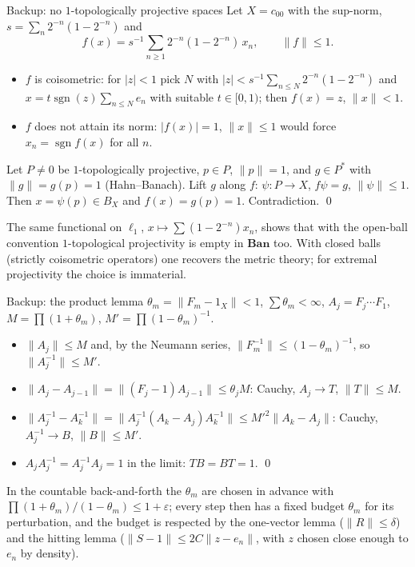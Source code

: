 \documentclass[10pt,aspectratio=169]{beamer}
\newcommand{\Ban}{\mathbf{Ban}}
\begin{document}
\begin{frame}{Backup: no $1$-topologically projective spaces}
  Let $X=c_{00}$ with the sup-norm, $s=\sum_n2^{-n}(1-2^{-n})$ and
  \[
    f(x)=s^{-1}\sum_{n\ge1}2^{-n}(1-2^{-n})\,x_n ,\qquad \|f\|\le1 .
  \]
  \begin{itemize}
    \item $f$ is coisometric: for $|z|<1$ pick $N$ with
      $|z|<s^{-1}\sum_{n\le N}2^{-n}(1-2^{-n})$ and $x=t\operatorname{sgn}(z)\sum_{n\le N}e_n$
      with suitable $t\in[0,1)$; then $f(x)=z$, $\|x\|<1$.
    \item $f$ does not attain its norm: $|f(x)|=1$, $\|x\|\le1$ would force
      $x_n=\operatorname{sgn}f(x)$ for all $n$.
  \end{itemize}
  \medskip
  Let $P\ne0$ be $1$-topologically projective, $p\in P$, $\|p\|=1$, and
  $g\in P^*$ with $\|g\|=g(p)=1$ (Hahn--Banach). Lift $g$ along $f$:
  $\psi\colon P\to X$, $f\psi=g$, $\|\psi\|\le1$. Then $x=\psi(p)\in B_X$ and
  $f(x)=g(p)=1$. Contradiction. \qed
  \medskip

  The same functional on $\ell_1$, $x\mapsto\sum(1-2^{-n})x_n$, shows that with
  the open-ball convention $1$-topological projectivity is empty in $\Ban$ too.
  With closed balls (strictly coisometric operators) one recovers the metric
  theory; for extremal projectivity the choice is immaterial.
\end{frame}

\begin{frame}{Backup: the product lemma}
  $\theta_m=\|F_m-1_X\|<1$, $\sum\theta_m<\infty$, $A_j=F_j\cdots F_1$,
  $M=\prod(1+\theta_m)$, $M'=\prod{(1-\theta_m)}^{-1}$.
  \begin{itemize}
    \item $\|A_j\|\le M$ and, by the Neumann series, $\|F_m^{-1}\|\le{(1-\theta_m)}^{-1}$,
      so $\|A_j^{-1}\|\le M'$.
    \item $\|A_j-A_{j-1}\|=\|(F_j-1)A_{j-1}\|\le\theta_jM$: Cauchy, $A_j\to T$, $\|T\|\le M$.
    \item $\|A_j^{-1}-A_k^{-1}\|=\|A_j^{-1}(A_k-A_j)A_k^{-1}\|\le{M'}^2\|A_k-A_j\|$:
      Cauchy, $A_j^{-1}\to B$, $\|B\|\le M'$.
    \item $A_jA_j^{-1}=A_j^{-1}A_j=1$ in the limit: $TB=BT=1$. \qed
  \end{itemize}
  \medskip
  In the countable back-and-forth the $\theta_m$ are chosen in advance with
  $\prod(1+\theta_m)/(1-\theta_m)\le1+\varepsilon$; every step then has a fixed
  budget $\theta_m$ for its perturbation, and the budget is respected by the
  one-vector lemma ($\|R\|\le\delta$) and the hitting lemma ($\|S-1\|\le2C\|z-e_n\|$,
  with $z$ chosen close enough to $e_n$ by density).
\end{frame}
\end{document}
